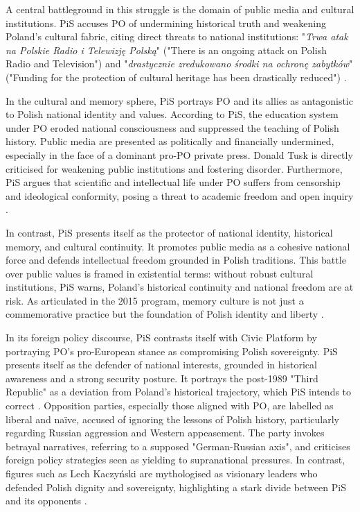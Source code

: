 A central battleground in this struggle is the domain of public media and cultural institutions. PiS accuses PO of undermining historical truth and weakening Poland's cultural fabric, citing direct threats to national institutions: "\textit{Trwa atak na Polskie Radio i Telewizję Polską}" ("There is an ongoing attack on Polish Radio and Television") and "\textit{drastycznie zredukowano środki na ochronę zabytków}" ("Funding for the protection of cultural heritage has been drastically reduced") \citep{pis_program_2014}.

In the cultural and memory sphere, PiS portrays PO and its allies as antagonistic to Polish national identity and values. According to PiS, the education system under PO eroded national consciousness and suppressed the teaching of Polish history. Public media are presented as politically and financially undermined, especially in the face of a dominant pro-PO private press. Donald Tusk is directly criticised for weakening public institutions and fostering disorder. Furthermore, PiS argues that scientific and intellectual life under PO suffers from censorship and ideological conformity, posing a threat to academic freedom and open inquiry \citep{pis_program_2014}.

In contrast, PiS presents itself as the protector of national identity, historical memory, and cultural continuity. It promotes public media as a cohesive national force and defends intellectual freedom grounded in Polish traditions. This battle over public values is framed in existential terms: without robust cultural institutions, PiS warns, Poland's historical continuity and national freedom are at risk. As articulated in the 2015 program, memory culture is not just a commemorative practice but the foundation of Polish identity and liberty \citep{pis_program_2014}.

In its foreign policy discourse, PiS contrasts itself with Civic Platform by portraying PO's pro-European stance as compromising Polish sovereignty. PiS presents itself as the defender of national interests, grounded in historical awareness and a strong security posture. It portrays the post-1989 "Third Republic" as a deviation from Poland's historical trajectory, which PiS intends to correct \citep{pis_program_2023}. Opposition parties, especially those aligned with PO, are labelled as liberal and naïve, accused of ignoring the lessons of Polish history, particularly regarding Russian aggression and Western appeasement. The party invokes betrayal narratives, referring to a supposed "German-Russian axis", and criticises foreign policy strategies seen as yielding to supranational pressures. In contrast, figures such as Lech Kaczyński are mythologised as visionary leaders who defended Polish dignity and sovereignty, highlighting a stark divide between PiS and its opponents \citep{pis_program_2023}.

